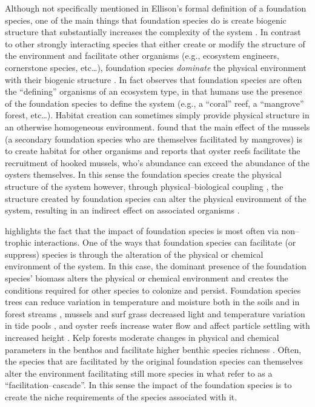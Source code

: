 \documentclass{article}
\begin{document}
Although not specifically mentioned in Ellison's formal definition of a foundation species, one of the main things that foundation species do is create biogenic structure that substantially increases the complexity of the system \cite{lenihan_physicalbiological_1999, ellison_loss_2005, ellison_foundation_2019, vozzo_co-occuring_2019, fields_foundation_2022, searles_oyster_2022}. In contrast to other strongly interacting species that either create or modify the structure of the environment and facilitate other organisms (e.g., ecosystem engineers, cornerstone species, etc\ldots), foundation species \emph{dominate} the physical environment with their biogenic structure \cite{ellison_foundation_2019}. In fact  observes that foundation species are often the ``defining'' organisms of an ecosystem type, in that humans use the presence of the foundation species to define the system (e.g., a ``coral'' reef, a ``mangrove'' forest, etc\ldots). Habitat creation can sometimes simply provide physical structure in an otherwise homogeneous environment.  found that the main effect of the mussels (a secondary foundation species who are themselves facilitated by mangroves) is to create habitat for other organisms and  reports that oyster reefs facilitate the recruitment of hooked mussels, who's abundance can exceed the abundance of the oysters themselves. In this sense the foundation species create the physical structure of the system however, through physical--biological coupling \cite{lenihan_physicalbiological_1999}, the structure created by foundation species can alter the physical environment of the system, resulting in an indirect effect on associated organisms \cite{searles_oyster_2022}. 

 highlights the fact that the impact of foundation species is most often via non--trophic interactions. One of the ways that foundation species can facilitate (or suppress) species is through the alteration of the physical or chemical environment of the system. In this case, the dominant presence of the foundation species' biomass alters the physical or chemical environment and creates the conditions required for other species to colonize and persist. Foundation species trees can reduce variation in temperature and moisture both in the soils and in forest streams \cite{ellison_loss_2005}, mussels and surf grass decreased light and temperature variation in tide pools \cite{fields_foundation_2022}, and oyster reefs increase water flow and affect particle settling with increased height \cite{lenihan_physicalbiological_1999}. Kelp forests moderate changes in physical and chemical parameters in the benthos and facilitate higher benthic species richness \cite{lamy_foundation_2020}. Often, the species that are facilitated by the original foundation species can themselves alter the environment facilitating still more species in what  refer to as a ``facilitation--cascade''. In this sense the impact of the foundation species is to create the niche requirements of the species associated with it. 
\end{document}
